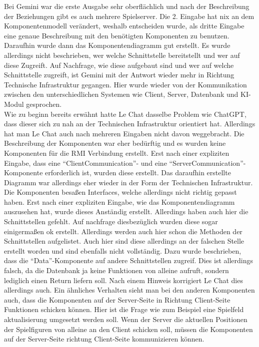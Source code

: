 Bei Gemini war die erste Ausgabe sehr oberflächlich und nach der Beschreibung der Beziehungen gibt es auch mehrere Spielserver. Die 2. Eingabe hat 
nix an dem Komponentenmodell verändert, weshalb entscheiden wurde, als dritte Eingabe eine genaue Beschreibung mit den benötigten Komponenten 
zu benutzen. Daraufhin wurde dann das Komponentendiagramm gut erstellt. Es wurde allerdings nicht beschrieben, wer welche Schnittstelle 
bereitstellt und wer auf diese Zugreift. Auf Nachfrage, wie diese aufgebaut sind und wer auf welche Schnittstelle zugreift, ist Gemini 
mit der Antwort wieder mehr in Richtung Technische Infrastruktur gegangen. Hier wurde wieder von der Kommunikation zwischen den unterschiedlichen 
Systemen wie Client, Server, Datenbank und KI-Modul gesprochen.\\

Wie zu beginn bereits erwähnt hatte Le Chat dasselbe Problem wie ChatGPT, dass dieser sich zu nah an der Technischen Infrastruktur orientiert hat.
Allerdings hat man Le Chat auch nach mehreren Eingaben nicht davon weggebracht. Die Beschreibung der Komponenten war eher bedürftig und es wurden 
keine Komponenten für die RMI Verbindung erstellt. Erst nach einer expliziten Eingabe, dass eine ``ClientCommunication''- und eine 
``ServerCommunication''-Komponente erforderlich ist, wurden diese erstellt. Das daraufhin erstellte Diagramm war allerdings eher wieder in der Form 
der Technischen Infrastruktur. Die Komponenten besaßen Interfaces, welche allerdings nicht richtig gepasst haben. Erst nach einer expliziten Eingabe, wie
das Komponentendiagramm auszusehen hat, wurde dieses Anständig erstellt. Allerdings haben auch hier die Schnittstellen gefehlt. Auf nachfrage diesbezüglich
wurden diese sogar einigermaßen ok erstellt. Allerdings werden auch hier schon die Methoden der Schnittstellen aufgelistet. Auch hier sind diese allerdings 
an der falschen Stelle erstellt worden und sind ebenfalls nicht vollständig. Dazu wurde beschrieben, dass die ``Data''-Komponente auf andere Schnittstellen
zugreif. Dies ist allerdings falsch, da die Datenbank ja keine Funktionen von alleine aufruft, sondern lediglich einen Return liefern soll. Nach einem Hinweis 
korrigiert Le Chat dies allerdings auch. Ein ähnliches Verhalten sieht man bei den anderen Komponenten auch, dass die Komponenten auf der Server-Seite in Richtung
Client-Seite Funktionen schicken können. Hier ist die Frage wie zum Beispiel eine Spielfeld aktualisierung umgesetzt werden soll. Wenn der Server die aktuellen 
Positionen der Spielfiguren von alleine an den Client schicken soll, müssen die Komponenten auf der Server-Seite richtung Client-Seite kommunizieren können.
